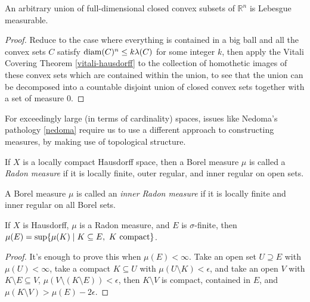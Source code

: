 \begin{cor} An arbitrary union of full-dimensional closed convex subsets of $\mathbb{R}^n$ is Lebesgue measurable.
\end{cor}
\begin{proof} Reduce to the case where everything is contained in a big ball and all the convex sets $C$ satisfy $\operatorname{diam}(C)^n \le k\lambda(C)$ for some integer $k$, then apply the Vitali Covering Theorem \ref{vitali-hausdorff} to the collection of homothetic images of these convex sets which are contained within the union, to see that the union can be decomposed into a countable disjoint union of closed convex sets together with a set of measure $0$.
\end{proof}

For exceedingly large (in terms of cardinality) spaces, issues like Nedoma's pathology \ref{nedoma} require us to use a different approach to constructing measures, by making use of topological structure.

\begin{defn} If $X$ is a locally compact Hausdorff space, then a Borel measure $\mu$ is called a \emph{Radon measure} if it is locally finite, outer regular, and inner regular on open sets.
\end{defn}

\begin{defn} A Borel measure $\mu$ is called an \emph{inner Radon measure} if it is locally finite and inner regular on all Borel sets.
\end{defn}

\begin{prop}\label{radon-sigma-finite} If $X$ is Hausdorff, $\mu$ is a Radon measure, and $E$ is $\sigma$-finite, then $\mu(E) = \sup \{\mu(K) \mid K \subseteq E,\ K\text{ \rm compact}\}$. 
\end{prop}
\begin{proof} It's enough to prove this when $\mu(E) < \infty$. Take an open set $U \supseteq E$ with $\mu(U) < \infty$, take a compact $K \subseteq U$ with $\mu(U\setminus K) < \epsilon$, and take an open $V$ with $K \setminus E \subseteq V$, $\mu(V\setminus(K\setminus E)) < \epsilon$, then $K\setminus V$ is compact, contained in $E$, and $\mu(K\setminus V) > \mu(E) - 2\epsilon$.
\end{proof}



